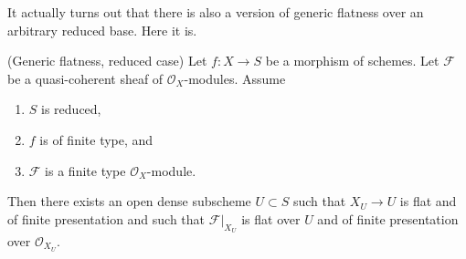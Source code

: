 \noindent
It actually turns out that there is also a version of generic
flatness over an arbitrary reduced base. Here it is.

\begin{proposition}
\label{proposition-generic-flatness-reduced}
(Generic flatness, reduced case)
Let $f : X \to S$ be a morphism of schemes.
Let $\mathcal{F}$ be a quasi-coherent sheaf of $\mathcal{O}_X$-modules.
Assume
\begin{enumerate}
\item $S$ is reduced,
\item $f$ is of finite type, and
\item $\mathcal{F}$ is a finite type $\mathcal{O}_X$-module.
\end{enumerate}
Then there exists an open dense subscheme $U \subset S$ such that
$X_U \to U$ is flat and of finite presentation and such that
$\mathcal{F}|_{X_U}$ is flat over $U$ and of finite presentation
over $\mathcal{O}_{X_U}$.
\end{proposition}

